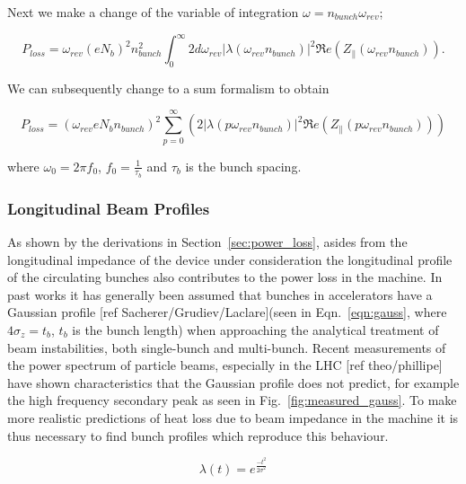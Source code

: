 Next we make a change of the variable of integration $\omega = n_{bunch}\omega_{rev}$;

\begin{equation}
P_{loss}   =  \omega_{rev} \left( eN_{b}   \right)^{2}n_{bunch}^{2} \int^{\infty}_{0} 2 d\omega_{rev} \left| \lambda \left( \omega_{rev}n_{bunch} \right)  \right|^{2}  \Re{}e \left( Z_{\parallel} \left( \omega_{rev}n_{bunch}\right)  \right).
\end{equation}

We can subsequently change to a sum formalism to obtain

\begin{equation}
P_{loss} = \left( \omega_{rev}eN_{b}n_{bunch}  \right)^{2} \displaystyle\sum\limits_{p = 0}^{\infty} \left( 2 \left| \lambda \left(p \omega_{rev}n_{bunch} \right)  \right|^{2}  \Re{}e \left( Z_{\parallel} \left(p \omega_{rev}n_{bunch}\right) \right) \right) \label{ean:heating-gen}
\end{equation}

where $\omega_{0} = 2\pi f_{0}$, $f_{0} = \frac{1}{\tau_{b}}$ and $\tau_{b}$ is the bunch spacing.

\subsubsection{Longitudinal Beam Profiles}

As shown by the derivations in Section~\ref{sec:power_loss}, asides from the longitudinal impedance of the device under consideration the longitudinal profile of the circulating bunches also contributes to the power loss in the machine. In past works it has generally been assumed that bunches in accelerators have a Gaussian profile [ref Sacherer/Grudiev/Laclare](seen in Eqn.~\ref{eqn:gauss}, where $4\sigma_{z} = t_{b}$, $t_{b}$ is the bunch length) when approaching the analytical treatment of beam instabilities, both single-bunch and multi-bunch. Recent measurements of the power spectrum of particle beams, especially in the LHC [ref theo/phillipe] have shown characteristics that the Gaussian profile does not predict, for example the high frequency secondary peak as seen in Fig.~\ref{fig:measured_gauss}. To make more realistic predictions of heat loss due to beam impedance in the machine it is thus necessary to find bunch profiles which reproduce this behaviour.

\begin{equation}
\lambda \left( t \right) = e^{\frac{-t^{2}}{2\sigma^{2}}}
\label{eqn:gauss}
\end{equation}

